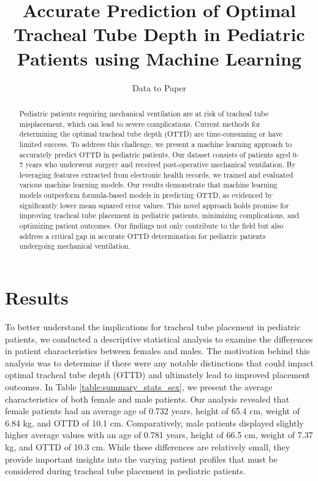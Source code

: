 \documentclass[11pt]{article}
\title{Accurate Prediction of Optimal Tracheal Tube Depth in Pediatric Patients using Machine Learning}
\author{Data to Paper}
\begin{document}
\maketitle
\begin{abstract}
Pediatric patients requiring mechanical ventilation are at risk of tracheal tube misplacement, which can lead to severe complications. Current methods for determining the optimal tracheal tube depth (OTTD) are time-consuming or have limited success. To address this challenge, we present a machine learning approach to accurately predict OTTD in pediatric patients. Our dataset consists of patients aged 0-7 years who underwent surgery and received post-operative mechanical ventilation. By leveraging features extracted from electronic health records, we trained and evaluated various machine learning models. Our results demonstrate that machine learning models outperform formula-based models in predicting OTTD, as evidenced by significantly lower mean squared error values. This novel approach holds promise for improving tracheal tube placement in pediatric patients, minimizing complications, and optimizing patient outcomes. Our findings not only contribute to the field but also address a critical gap in accurate OTTD determination for pediatric patients undergoing mechanical ventilation.
\end{abstract}
\section*{Results}

To better understand the implications for tracheal tube placement in pediatric patients, we conducted a descriptive statistical analysis to examine the differences in patient characteristics between females and males. The motivation behind this analysis was to determine if there were any notable distinctions that could impact optimal tracheal tube depth (OTTD) and ultimately lead to improved placement outcomes. In Table \ref{table:summary_stats_sex}, we present the average characteristics of both female and male patients. Our analysis revealed that female patients had an average age of 0.732 years, height of 65.4 cm, weight of 6.84 kg, and OTTD of 10.1 cm. Comparatively, male patients displayed slightly higher average values with an age of 0.781 years, height of 66.5 cm, weight of 7.37 kg, and OTTD of 10.3 cm. While these differences are relatively small, they provide important insights into the varying patient profiles that must be considered during tracheal tube placement in pediatric patients.
\end{document}
